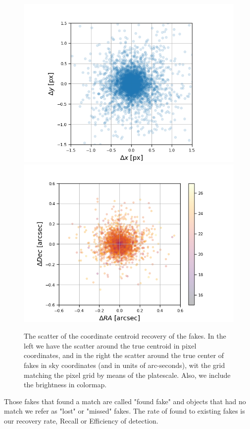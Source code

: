\begin{figure}
    \centering
    \includegraphics[width=0.49\linewidth]{figures/scatter_xy_diaSrcs_match_px.png}
    \includegraphics[width=0.49\linewidth]{figures/scatter_radec_diaSrcs_match_arsec_mag.png}
    \caption{The scatter of the coordinate centroid recovery of the fakes. In the left we have the scatter around the true centroid in pixel coordinates, and in the right the scatter around the true center of fakes in sky coordinates (and in units of arc-seconds), wit the grid matching the pixel grid by means of the platescale. Also, we include the brightness in colormap.}
    \label{fig:scatter_radec_diaSrcs_match_arsec_mag}
\end{figure}

Those fakes that found a match are called "found fake" and objects that had no match we refer as "lost" or "missed" fakes. 
The rate of found to existing fakes is our recovery rate, Recall or Efficiency of detection. 

